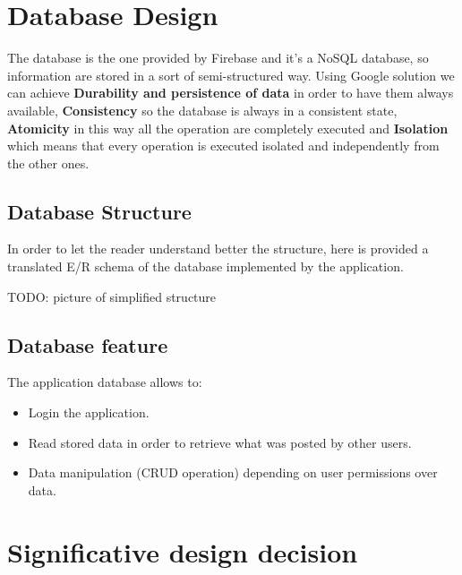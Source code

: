 \section{Database Design}
	The database is the one provided by Firebase and it's a NoSQL database, so information are stored in a sort of semi-structured way.
	Using Google solution we can achieve \textbf{Durability and persistence of data} in order to have them always available, 
	\textbf{Consistency} so the database is always in a consistent state, \textbf{Atomicity} in this way all the operation are completely executed and 
	\textbf{Isolation} which means that every operation is executed isolated and independently from the other ones.
	
	\subsection{Database Structure}
	In order to let the reader understand better the structure, here is provided a translated E/R schema of the database implemented by the application.
	
	TODO: picture of simplified structure 

	\subsection{Database feature}
	The application database allows to:
	
	\begin{itemize}
		\item Login the application.
		\item Read stored data in order to retrieve what was posted by other users.
		\item Data manipulation (CRUD operation) depending on user permissions over data.
	\end{itemize}
	
	
\section{Significative design decision}